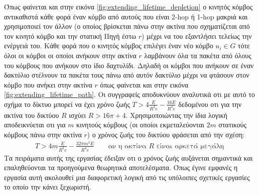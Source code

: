 Όπως φαίνεται και στην εικόνα \ref{fig:extending_lifetime_depletion} ο κινητός κόμβος αντικαθιστά κάθε φορά έναν κόμβο από αυτούς που είναι 2-hop ή 1-hop μακριά και
χρησιμοποιεί τον άλλον (ο οποίος βρίσκεται πάνω στην ακτίνα που σχηματίζεται από τον κινητό κόμβο και την στατική Πηγή έστω $r$) μέχρι να του εξαντλήσει τελείως την
ενέργειά του. Κάθε φορά που ο κινητός κόμβος επιλέγει έναν νέο κόμβο $u_{i}\in G$ τότε όλοι οι κόμβοι οι οποίοι ανήκουν στην ακτίνα $r$ λαμβάνουν όλα τα πακέτα από
όλους του κόμβους που ανήκουν στο ίδιο δαχτυλίδι. Δηλαδή οι κόμβοι που ανήκουν σε έναν δακτύλιο στέλνουν τα πακέτα τους πάνω από αυτόν δακτύλιο μέχρι να φτάσουν στον
κόμβο που ανήκει στην ακτίνα $r$ όπως φαίνεται και στην εικόνα \ref{fig:extending_lifetime_path}. Οι συγγραφείς αποδυκνύουν αναλυτικά οτι με αυτό το σχήμα το δίκτυο
μπορεί να έχει χρόνο ζωής  $T>4\frac{E}{R^{2}e}-\frac{16E}{R^{4}e}$ δεδομένου οτι για την ακτίνα του δικτύου $R$ ισχύει $R>16\pi+4$. Χρησιμοποιώντας την ίδια λογική
αποδεικνύεται οτι για $m$ κινητούς κόμβους (οι οποίοι εκμεταλεύονται $2m$ στατικούς κόμβους πάνω στην ακτίνα $r$) ο χρόνος ζωής του δικτύου φράσεται από την σχέση:
\begin{align*}
T>4m\frac{E}{R^{2}e}-\frac{32\pi m^{3}E}{R^{4}e} \qquad\text{αν η ακτίνα $R$ είναι αρκετά μεγάλη}
\end{align*}
Τα πειράματα αυτής της εργασίας έδειξαν οτι ο χρόνος ζωής αυξάνεται σημαντικά και επαληθεύονται τα προηγούμενα θεωρητικά αποτελέσματα. Όπως έγινε εμφανές η εργασία
αυτή ακολουθεί μια διαφορετική λογική από τις υπόλοιπες σχετικές εργασίες το οποίο την κάνει ξεχωριστή.

